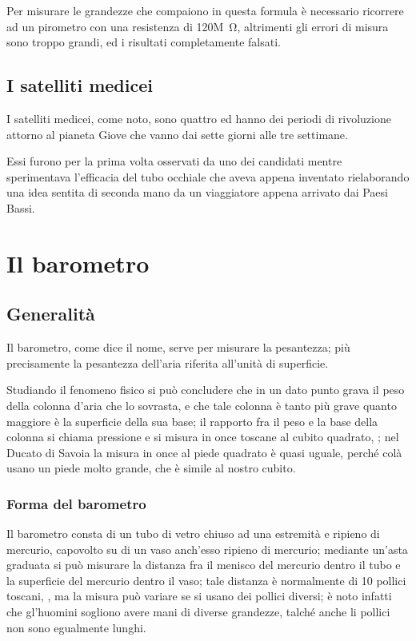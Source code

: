 \documentclass[%
    corpo=13pt,
    twoside,
    oldstyle,
    autoretitolo,
    greek,
    evenboxes,
]{toptesi}
\begin{document}
Per misurare le grandezze che compaiono in questa formula \`e necessario
ricorrere ad un pirometro con una resistenza di 120\unit{M\ohm}, altrimenti gli
errori di misura sono troppo grandi, ed i risultati completamente falsati.

\section{I satelliti medicei}
I satelliti medicei, come noto, sono quattro ed hanno dei periodi di rivoluzione
attorno al pianeta Giove che vanno dai sette giorni alle tre settimane.

Essi furono per la prima volta osservati da uno dei candidati mentre
sperimentava l'efficacia del tubo occhiale che aveva appena inventato
rielaborando una idea sentita di seconda mano da un viaggiatore appena arrivato
dai Paesi Bassi.





\chapter{Il barometro}
\section{Generalit\`a}
\begin{interlinea}{0.87} Il barometro, come dice il nome, serve per
misurare la pesantezza; pi\`u precisamente la pesantezza dell'aria
riferita all'unit\`a di superficie.
\end{interlinea}

\begin{interlinea}{2} Studiando il fenomeno fisico si pu\`o concludere
che in un dato punto grava il peso della colonna d'aria che lo
sovrasta, e che tale colonna \`e tanto pi\`u grave quanto maggiore
\`e la superficie della sua base; il rapporto fra il peso e la base
della colonna si chiama pressione e si misura in once toscane al cubito
quadrato, \cite{tor1}; nel Ducato di Savoia la misura in once al piede
quadrato \`e quasi uguale, perch\'e col\`a usano un piede molto
grande, che \`e simile al nostro cubito.
\end{interlinea}

\subsection{Forma del barometro}
Il barometro consta di un tubo di vetro chiuso ad una estremit\`a e
ripieno di mercurio, capovolto su di un vaso anch'esso ripieno di
mercurio; mediante un'asta graduata si pu\`o misurare la distanza fra
il menisco del mercurio dentro il tubo e la superficie del mercurio
dentro il vaso; tale distanza \`e normalmente di 10 pollici toscani,
\cite{tor1,tor2}, ma la misura pu\`o variare se si usano dei pollici
diversi; \`e noto infatti che gl'huomini sogliono avere mani di
diverse grandezze, talch\'e anche li pollici non sono egualmente
lunghi.
\end{document}
